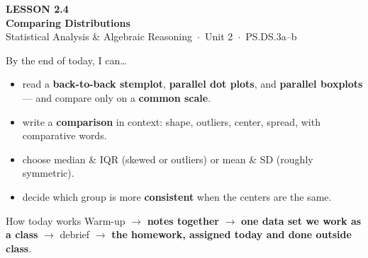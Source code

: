\documentclass[aspectratio=169, 11pt]{beamer}
\begin{document}
{
\begin{frame}[plain]
  \vspace{2.8cm}\hspace{0.55cm}%
  \begin{minipage}{0.9\textwidth}
    {\color{goldacc}\bfseries\small LESSON 2.4}\\[0.5cm]
    {\color{white}\bfseries\LARGE Comparing Distributions}\\[1.2cm]
    {\color{frostmid}\small Statistical Analysis \& Algebraic Reasoning~$\cdot$~Unit 2~$\cdot$~PS.DS.3a--b}
  \end{minipage}
\end{frame}
}

\begin{frame}[t, plain]
  By the end of today, I can\ldots
  \begin{itemize}\setlength{\itemsep}{4pt}
    \item read a \textbf{back-to-back stemplot}, \textbf{parallel dot plots}, and
          \textbf{parallel boxplots} --- and compare only on a \textbf{common scale}.
    \item write a \textbf{comparison} in context: shape, outliers, center, spread, with
          comparative words.
    \item choose median \& IQR (skewed or outliers) or mean \& SD (roughly symmetric).
    \item decide which group is more \textbf{consistent} when the centers are the same.
  \end{itemize}
  \begin{block}{How today works}
    Warm-up $\to$ \textbf{notes together} $\to$ \textbf{one data set we work as a class} $\to$
    debrief $\to$ \textbf{the homework, assigned today and done outside class}.
  \end{block}
\end{frame}
\end{document}
